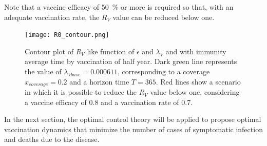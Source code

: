 Note that a vaccine efficacy of \SI{50}{\percent} or more is required so that, with an
adequate vaccination rate, the $R_V$ value can be reduced below one.

\begin{figure}[tbh]
    \centering
    \texttt{[image: R0\_contour.png]}
    \caption{
        Contour plot  of $R_V$ like function of $ \epsilon $ and $ \lambda_V $ and with
        immunity average time by vaccination of half year. Dark green line represents the
        value of $\lambda_{Vbase}=\num{0.000611}$, corresponding to a coverage
        $x_{coverage} = \num{0.2}$ and a
        horizon time $T=\num{365}$. Red lines show a scenario in which it is possible to
        reduce the $R_V$ value below one, considering a vaccine efficacy of
        \num{0.8} and a vaccination rate
        of \num{0.7}.}
    \label{R0_contour}
\end{figure}

In the next section, the optimal control theory will be applied to propose optimal
vaccination dynamics that minimize the number of cases of symptomatic infection and deaths
due to the disease.